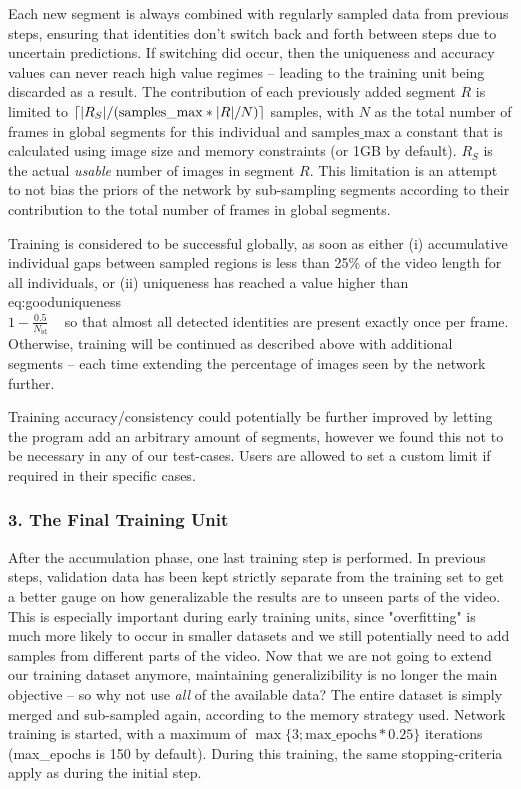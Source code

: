 \documentclass[9pt,lineno]{elife}
\makeatletter
\DeclarePairedDelimiter\ceil{\lceil}{\rceil}
\newcommand*{\inlineequation}[2][]{%
  \begingroup
    \refstepcounter{equation}%
    \ifx\\#1\\%
    \else
      \label{#1}%
    \fi
    \relpenalty=10000 %
    \binoppenalty=10000 %
    \ensuremath{%
      #2%
    }%
    ~\@eqnnum
  \endgroup
}
\makeatother
\begin{document}
Each new segment is always combined with regularly sampled data from previous steps, ensuring that identities don't switch back and forth between steps due to uncertain predictions. If switching did occur, then the uniqueness and accuracy values can never reach high value regimes -- leading to the training unit being discarded as a result. The contribution of each previously added segment $R$ is limited to $\ceil{|R_S| / ( \mathrm{samples\_max} * |R| / N )}$ samples, with $N$ as the total number of frames in global segments for this individual and $\mathrm{samples\_max}$ a constant that is calculated using image size and memory constraints (or 1GB by default). $R_S$ is the actual \textit{usable} number of images in segment $R$. This limitation is an attempt to not bias the priors of the network by sub-sampling segments according to their contribution to the total number of frames in global segments.


Training is considered to be successful globally, as soon as either (i) accumulative individual gaps between sampled regions is less than 25\% of the video length for all individuals, or (ii) uniqueness has reached a value higher than {\color{blue}
\inlineequation[eq:gooduniqueness]{1-\frac{0.5}{N_{\mathrm{id}}}} }
so that almost all detected identities are present exactly once per frame. Otherwise, training will be continued as described above with additional segments -- each time extending the percentage of images seen by the network further.

Training accuracy/consistency could potentially be further improved by letting the program add an arbitrary amount of segments, however we found this not to be necessary in any of our test-cases. Users are allowed to set a custom limit if required in their specific cases.

\subsubsection{3. The Final Training Unit}

After the accumulation phase, one last training step is performed. In previous steps, validation data has been kept strictly separate from the training set to get a better gauge on how generalizable the results are to unseen parts of the video. {\color{blue}This is especially important during early training units, since "overfitting" is much more likely to occur in smaller datasets and we still potentially need to add samples from different parts of the video. Now that we are not going to extend our training dataset anymore, maintaining generalizibility is no longer the main} objective -- so why not use \textit{all} of the available data? The entire dataset is simply merged and sub-sampled again, according to the memory strategy used. Network training is started, with a maximum of $\max\{ 3; \mathrm{max\_epochs} * 0.25 \}$ iterations (max\_epochs is 150 by default). During this training, the same stopping-criteria apply as during the initial step.
\end{document}

